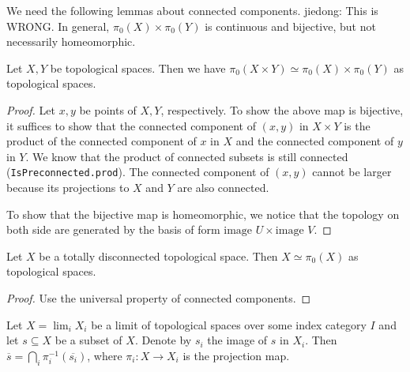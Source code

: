 We need the following lemmas about connected components. {\color{red} jiedong: This is WRONG. 
In general, $\pi_0(X) \times \pi_0(Y)$ is continuous and bijective, but not necessarily homeomorphic.}

\begin{lemma}
  \label{thm:pi0-prod}
  \leanok
  Let \(X, Y\) be topological spaces. Then we have 
  \(\pi_0 (X \times Y) \simeq \pi_0(X) \times \pi_0(Y)\) as topological spaces.
\end{lemma}

\begin{proof}
  Let $x, y$ be points of \(X, Y\), respectively. To show the above map is bijective, 
  it suffices to show that the connected component of \((x,y)\) in \(X \times Y\) is the product 
  of the connected component of \(x\) in \(X\) and  the connected component of \(y\) in \(Y\).
  We know that the product of connected subsets is still connected (\verb`IsPreconnected.prod`). 
  The connected component of \((x, y)\) cannot be larger because its projections to \(X\) and \(Y\) 
  are also connected. 

  To show that the bijective map is homeomorphic, we notice that the topology on both side
  are generated by the basis of form \(\text{image } U \times \text{image } V\).
\end{proof}

\begin{lemma}
  \label{thm:pi0-isom}
  \leanok
  Let \(X\) be a totally disconnected topological space. 
  Then \(X \simeq \pi_0 (X)\) as topological spaces.
\end{lemma}

\begin{proof}
  \leanok
  Use the universal property of connected components.
\end{proof}

\begin{lemma}
  Let $X = \lim_i X_i$ be a limit of topological spaces over some index category \(I\) and let
  $s \subseteq X$ be a subset of \(X\). Denote by $s_i$ the image of $s$ in $X_i$. Then
  $\overline{s} = \bigcap_i \pi_i^{-1} (\overline{s_i})$, where $\pi_i : X \to X_i$ is the projection map.
  \label{lemma:closure-limit-intersection}
  \leanok
\end{lemma}

